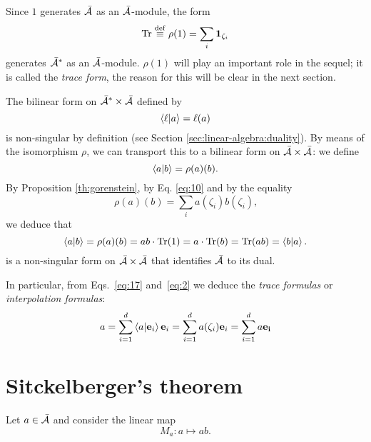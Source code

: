 Since $1$ generates $\bar{\mathcal{A}}$ as an $\bar{\mathcal{A}}$-module, the form
\begin{equation}
  \label{eq:7}
  \operatorname{Tr} \overset{\mathrm{def}}{\equiv} \rho(1) = \sum_i\mathbf{1}_{\zeta_i}
\end{equation}
generates $\bar{\mathcal{A}}^\ast$ as an $\bar{\mathcal{A}}$-module.
$\rho(1)$ will play an important role in the sequel; it is called the
\emph{trace form}, the reason for this will be clear in the next
section.

The bilinear form on $\bar{\mathcal{A}}^\ast\times\bar{\mathcal{A}}$
defined by
\begin{equation}
  \label{eq:11}
  \left\langle \ell \middle| a \right\rangle = \ell(a)
\end{equation}
is non-singular by definition (see Section
\ref{sec:linear-algebra:duality}). By means of the isomorphism $\rho$,
we can transport this to a bilinear form on
$\bar{\mathcal{A}}\times\bar{\mathcal{A}}$: we define
\begin{equation}
  \label{eq:15}
  \left\langle a \middle| b \right\rangle=\rho(a)(b)
  \text{.}
\end{equation}
By Proposition \ref{th:gorenstein}, by Eq. \eqref{eq:10} and by the
equality
\begin{equation}
  \label{eq:16}
  \rho(a)(b) = \sum_i a(\zeta_i)b(\zeta_i)
  \text{,}
\end{equation}
we deduce that
\begin{equation}
  \label{eq:17}
  \left\langle a \middle| b \right\rangle = \rho(a)(b) = ab\cdot\operatorname{Tr}(1) = a\cdot\operatorname{Tr}(b) = \operatorname{Tr}(ab) = \left\langle b \middle| a \right\rangle
  \text{.}
\end{equation}
is a non-singular form on $\bar{\mathcal{A}}\times\bar{\mathcal{A}}$
that identifies $\bar{\mathcal{A}}$ to its dual.

In particular, from Eqs.~\eqref{eq:17} and~\eqref{eq:2} we deduce the
\emph{trace formulas} or \emph{interpolation formulas}:
\begin{equation}
  \label{eq:21}
  a = \sum_{i=1}^d\left\langle a \middle| \mathbf{e}_i \right\rangle\mathbf{e}_i=\sum_{i=1}^da(\zeta_i)\mathbf{e}_i=\sum_{i=1}^da\mathbf{e_i}
\end{equation}


\section{Sitckelberger's theorem}
\label{sec:multiplication}

Let $a\in\bar{\mathcal{A}}$ and consider the linear map
\begin{equation}
  \label{eq:18}
  M_a:a \mapsto ab
  \text{.}
\end{equation}

